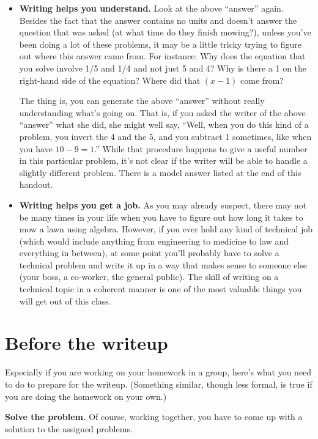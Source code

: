 \documentclass{article}
\begin{document}
\begin{itemize}

\item \textbf{Writing helps you understand.} Look at the above ``answer'' again. Besides the fact that the answer contains no units and doesn't answer the question that was asked (at what time do they finish mowing?), unless you've been doing a lot of these problems, it may be a little tricky trying to figure out where this answer came from. For instance: Why does the equation that you solve involve 1/5 and 1/4 and not just 5 and 4? Why is there a 1 on the right-hand side of the equation? Where did that $(x-1)$ come from?

The thing is, you can generate the above ``answer'' without really understanding what's going on. That is, if you asked the writer of the above ``answer'' what she did, she might well say, ``Well, when you do this kind of a problem, you invert the 4 and the 5, and you subtract 1 sometimes, like when you have $10 - 9 = 1$.'' While that procedure happens to give a useful number in this particular problem, it’s not clear if the writer will be able to handle a slightly different problem. There is a model answer listed at the end of this handout.

\item \textbf{Writing helps you get a job.} As you may already suspect, there may not be many times in your life when you have to figure out how long it takes to mow a lawn using algebra. However, if you ever hold any kind of technical job (which would include anything from engineering to medicine to law and everything in between), at some point you'll probably have to solve a technical problem and write it up in a way that makes sense to someone else (your boss, a co-worker, the general public). The skill of writing on a technical topic in a coherent manner is one of the most valuable things you will get out of this class.

\end{itemize}

\section*{Before the writeup}

Especially if you are working on your homework in a group, here's what you need to do to prepare for the writeup. (Something similar, though less formal, is true if you are doing the homework on your own.)

\textbf{Solve the problem.} Of course, working together, you have to come up with a solution to the assigned problems.
\end{document}
